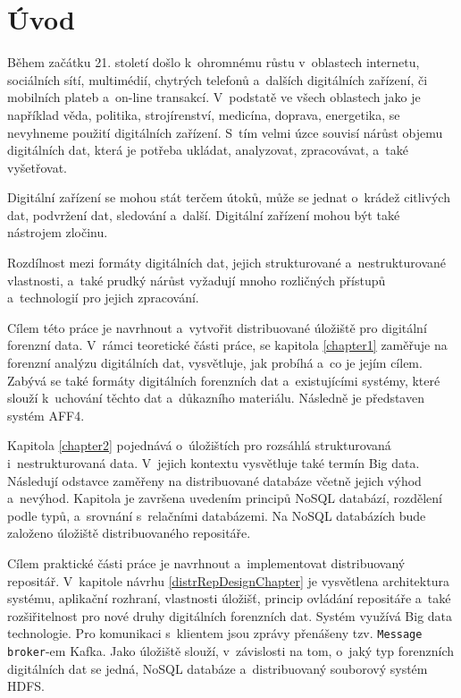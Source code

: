 

\chapter{Úvod}
Během začátku 21. století došlo k~ohromnému růstu v~oblastech internetu, sociálních sítí, multimédií, chytrých telefonů a~dalších digitálních zařízení, či mobilních plateb a~on-line transakcí. V~podstatě ve všech oblastech jako je například věda, politika, strojírenství, medicína, doprava, energetika, se nevyhneme použití digitálních zařízení. S~tím velmi úzce souvisí nárůst objemu digitálních dat, která je potřeba ukládat, analyzovat, zpracovávat, a~také vyšetřovat.

Digitální zařízení se mohou stát terčem útoků, může se jednat o~krádež citlivých dat, podvržení dat, sledování a~další. Digitální zařízení mohou být také nástrojem zločinu.

Rozdílnost mezi formáty digitálních dat, jejich strukturované a~nestrukturované vlastnosti, a~také prudký nárůst vyžadují mnoho rozličných přístupů a~technologií pro jejich zpracování.

Cílem této práce je navrhnout a~vytvořit distribuované úložiště pro digitální forenzní data. V~rámci teoretické části práce, se kapitola \ref{chapter1} zaměřuje na forenzní analýzu digitálních dat, vysvětluje, jak probíhá a~co je jejím cílem. Zabývá se také formáty digitálních forenzních dat a~existujícími systémy, které slouží k~uchování těchto dat a~důkazního materiálu. Následně je představen systém AFF4.

Kapitola \ref{chapter2} pojednává o~úložištích pro rozsáhlá strukturovaná i~nestrukturovaná data. V~jejich kontextu vysvětluje také termín Big data. Následují odstavce zaměřeny na distribuované databáze včetně jejich výhod a~nevýhod. Kapitola je završena uvedením principů NoSQL databází, rozdělení podle typů, a~srovnání s~relačními databázemi. Na NoSQL databázích bude založeno úložiště distribuovaného repositáře.

Cílem praktické části práce je navrhnout a~implementovat distribuovaný repositář. V~kapitole návrhu \ref{distrRepDesignChapter} je vysvětlena architektura systému, aplikační rozhraní, vlastnosti úložišť, princip ovládání repositáře a~také rozšiřitelnost pro nové druhy digitálních forenzních dat. Systém využívá Big data technologie. Pro komunikaci s~klientem jsou zprávy přenášeny tzv. \texttt{Message broker}-em Kafka. Jako úložiště slouží, v~závislosti na tom, o~jaký typ forenzních digitálních dat se jedná, NoSQL databáze a~distribuovaný souborový systém HDFS.

